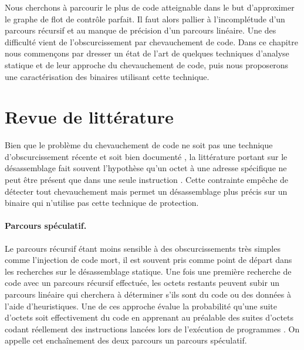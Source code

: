 Nous cherchons à parcourir le plus de code atteignable dans le but d'approximer le graphe de flot de contrôle parfait.
Il faut alors pallier à l'incomplétude d'un parcours récursif et au manque de précision d'un parcours linéaire.
Une des difficulté vient de l'obscurcissement par chevauchement de code. 
Dans ce chapitre nous commençons par dresser un état de l'art de quelques techniques d'analyse statique et de leur approche du chevauchement de code, puis nous proposerons une caractérisation des binaires utilisant cette technique.


\section{Revue de littérature}
Bien que le problème du chevauchement de code ne soit pas une technique d'obscurcissement récente et soit bien documenté \cite{PMA}, la littérature portant sur le désassemblage fait souvent l'hypothèse qu'un octet à une adresse spécifique ne peut être présent que dans une seule instruction \cite{KruegelRVV04}. 
Cette contrainte empêche de détecter tout chevauchement mais permet un désassemblage plus précis sur un binaire qui n'utilise pas cette technique de protection.


\paragraph{Parcours spéculatif.}
Le parcours récursif étant moins sensible à des obscurcissements très simples comme l'injection de code mort, il est souvent pris comme point de départ dans les recherches sur le désassemblage statique.
Une fois une première recherche de code avec un parcours récursif effectuée, les octets restants peuvent subir un parcours linéaire qui cherchera à déterminer s'ils sont du code ou des données à l'aide d'heuristiques.
Une de ces approche évalue la probabilité qu'une suite d'octets soit effectivement du code en apprenant au préalable des suites d'octets codant réellement des instructions lancées lors de l'exécution de programmes \cite{KDF09}.
On appelle cet enchaînement des deux parcours un parcours spéculatif.

